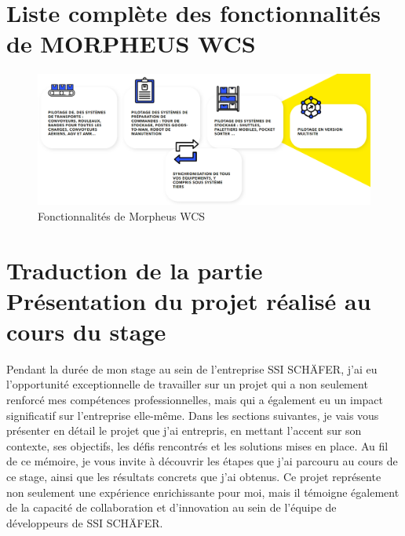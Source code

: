 \documentclass[a4paper, 12pt, french]{article}
\begin{document}
		\section{Liste complète des fonctionnalités de MORPHEUS WCS}\label{appendix:morpheusWCSFonctionnalites}
			\begin{figure}[h!]
					\includegraphics[width=\linewidth]{images/morpheus_wcs_fonctionnalites.png}
					\caption{Fonctionnalités de Morpheus WCS}%
					\label{fig:morpheus_wcs_fonctionnalites}
			\end{figure}

			\newpage

		\section{Traduction de la partie Présentation du projet réalisé au cours du stage}\label{appendix_presentation_projet_translation}
			Pendant la durée de mon stage au sein de l'entreprise SSI SCHÄFER, j'ai eu l'opportunité exceptionnelle de travailler sur un projet qui a non seulement renforcé mes compétences professionnelles, mais qui a également eu un impact significatif sur l'entreprise elle-même. Dans les sections suivantes, je vais vous présenter en détail le projet que j'ai entrepris, en mettant l'accent sur son contexte, ses objectifs, les défis rencontrés et les solutions mises en place. Au fil de ce mémoire, je vous invite à découvrir les étapes que j'ai parcouru au cours de ce stage, ainsi que les résultats concrets que j'ai obtenus. Ce projet représente non seulement une expérience enrichissante pour moi, mais il témoigne également de la capacité de collaboration et d'innovation au sein de l'équipe de développeurs de SSI SCHÄFER.
		
\end{document}
